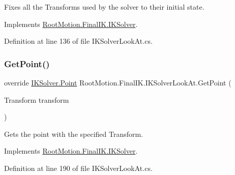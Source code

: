 Fixes all the Transforms used by the solver to their initial state. 



Implements \mbox{\hyperlink{class_root_motion_1_1_final_i_k_1_1_i_k_solver_a266ec32ebdd83faaf37abc41718061b7}{Root\+Motion.\+Final\+I\+K.\+I\+K\+Solver}}.



Definition at line 136 of file I\+K\+Solver\+Look\+At.\+cs.

\mbox{\label{class_root_motion_1_1_final_i_k_1_1_i_k_solver_look_at_ad2a93f6d541ff1a901ba93748094ff9b}} 
\subsubsection{\texorpdfstring{Get\+Point()}{GetPoint()}}
{\footnotesize\ttfamily override \mbox{\hyperlink{class_root_motion_1_1_final_i_k_1_1_i_k_solver_1_1_point}{I\+K\+Solver.\+Point}} Root\+Motion.\+Final\+I\+K.\+I\+K\+Solver\+Look\+At.\+Get\+Point (\begin{DoxyParamCaption}\item[{Transform}]{transform }\end{DoxyParamCaption})\hspace{0.3cm}{\ttfamily [virtual]}}



Gets the point with the specified Transform. 



Implements \mbox{\hyperlink{class_root_motion_1_1_final_i_k_1_1_i_k_solver_a8e845886025fb0ca404b85f6747f7281}{Root\+Motion.\+Final\+I\+K.\+I\+K\+Solver}}.



Definition at line 190 of file I\+K\+Solver\+Look\+At.\+cs.

\mbox{\label{class_root_motion_1_1_final_i_k_1_1_i_k_solver_look_at_ac2f6da94b707c8482aced5abc64a341f}} 
